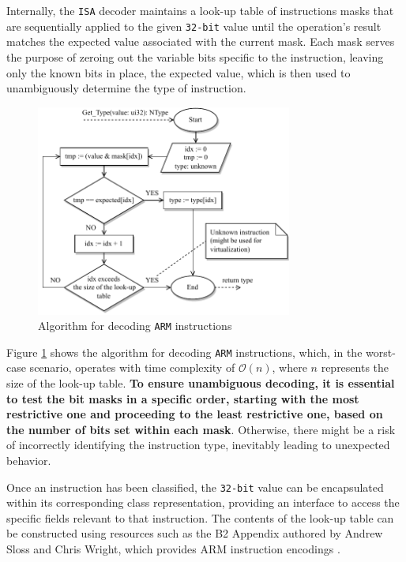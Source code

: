 \documentclass[english, ing, kiv, he, iso690numb, pdf]{fasthesis}
\begin{document}
	Internally, the \texttt{ISA} decoder maintains a look-up table of instructions masks that are sequentially applied to the given \texttt{32-bit} value until the operation's result matches the expected value associated with the current mask. Each mask serves the purpose of zeroing out the variable bits specific to the instruction, leaving only the known bits in place, the expected value, which is then used to unambiguously determine the type of instruction.
	
	\begin{figure}[ht]
		\centering
		\includegraphics[width=0.75\textwidth]{img/diagrams/isa_decoder_2.pdf}
		\caption{Algorithm for decoding \texttt{ARM} instructions}
		\label{Algorithm for decoding ARM instructions}
	\end{figure}
	
	\newpage
	
	Figure \ref{Algorithm for decoding ARM instructions} shows the algorithm for decoding \texttt{ARM} instructions, which, in the worst-case scenario, operates with time complexity of $\mathcal{O}(n)$, where $n$ represents the size of the look-up table. \textbf{To ensure unambiguous decoding, it is essential to test the bit masks in a specific order, starting with the most restrictive one and proceeding to the least restrictive one, based on the number of bits set within each mask}. Otherwise, there might be a risk of incorrectly identifying the instruction type, inevitably leading to unexpected behavior.
	
	Once an instruction has been classified, the \texttt{32-bit} value can be encapsulated within its corresponding class representation, providing an interface to access the specific fields relevant to that instruction. The contents of the look-up table can be constructed using resources such as the B2 Appendix authored by Andrew Sloss and Chris Wright, which provides ARM instruction encodings \cite{B2_appendix}. 
	
\end{document}
